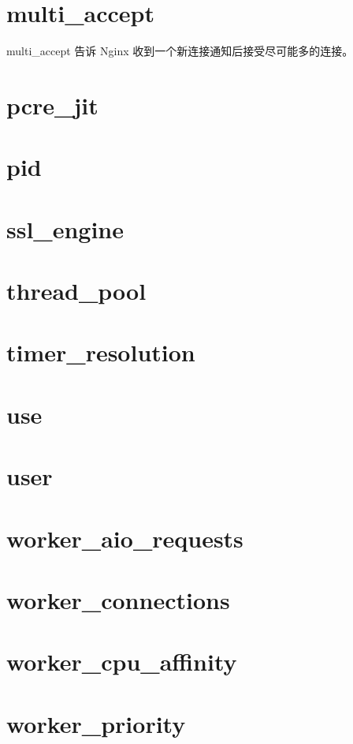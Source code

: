 \chapter{multi\_accept}


multi\_accept 告诉 Nginx 收到一个新连接通知后接受尽可能多的连接。


\chapter{pcre\_jit}


\chapter{pid}


\chapter{ssl\_engine}


\chapter{thread\_pool}


\chapter{timer\_resolution}


\chapter{use}


\chapter{user}


\chapter{worker\_aio\_requests}


\chapter{worker\_connections}


\chapter{worker\_cpu\_affinity}


\chapter{worker\_priority}


